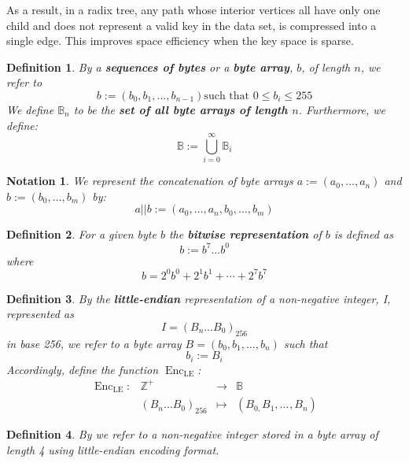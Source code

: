 \documentclass{book}
\newcommand{\assign}{:=}
\newcommand{\tmname}[1]{\textsc{#1}}
\newcommand{\tmop}[1]{\ensuremath{\operatorname{#1}}}
\newcommand{\tmstrong}[1]{\textbf{#1}}
\newcommand{\tmtextbf}[1]{{\bfseries{#1}}}
\newcommand{\tmtextsc}[1]{{\scshape{#1}}}
\newcommand{\tmtexttt}[1]{{\ttfamily{#1}}}
\newcommand{\tmverbatim}[1]{{\ttfamily{#1}}}
\newtheorem{definition}{Definition}
\newtheorem{notation}{Notation}
\providecommand{\tmname}[1]{\tmtextsc{#1}}
\providecommand{\tmop}[1]{\ensuremath{\mathrm{#1}}}
\providecommand{\tmstrong}[1]{\tmtextbf{#1}}
\providecommand{\tmtextbf}[1]{\tmtextbf{#1}}
\providecommand{\tmverbatim}[1]{\tmtexttt{#1}}
\newtheorem{definition}{Definition}
\newtheorem{notation}{Notation}
\begin{document}
As a result, in a radix tree, any path whose interior vertices all have only
one child and does not represent a valid key in the data set, is compressed
into a single edge. This improves space efficiency when the key space is
sparse.

\begin{definition}
  By a {\tmstrong{sequences of bytes}} or a {\tmstrong{byte array}}, $b$, of
  length $n$, we refer to
  \[ b \assign (b_0, b_1, ..., b_{n - 1})  \text{such that } 0 \leqslant b_i
     \leqslant 255 \]
  We define \label{autolab2}$\mathbb{B}_n$ to be the {\tmstrong{set of all
  byte arrays of length $n$}}. Furthermore, we define:
  \[ \mathbb{B} \assign \bigcup^{\infty}_{i = 0} \mathbb{B}_i \]
\end{definition}

\begin{notation}
  We represent the concatenation of byte arrays $a \assign (a_0, \ldots, a_n)$
  and $b \assign (b_0, \ldots, b_m)$ by:
  \[ a || b \assign (a_0, \ldots, a_n, b_0, \ldots, b_m) \]
\end{notation}

\begin{definition}
  \label{defn-bit-rep}For a given byte $b$ the {\tmstrong{bitwise
  representation}} of $b$ is defined as
  \[ b \assign b^7 \ldots b^0 \]
  where
  \[ b = 2^0 b^0 + 2^1 b^1 + \cdots + 2^7 b^7 \]
\end{definition}

\begin{definition}
  \label{defn-little-endian}By \tmverbatim{}the {\tmstrong{little-endian}}
  representation of a non-negative integer, \label{autolab3}I, represented as
  \[ I = (B_n \ldots B_0)_{256} \]
  in base 256, we refer to a byte array \label{autolab4}$B = (b_0, b_1,
  \ldots, b_n)$ such that
  \[ b_i \assign B_i \]
  Accordingly, define the function \label{autolab5}$\tmop{Enc}_{\tmop{LE}}$:
  \[ \begin{array}{llll}
       \tmop{Enc}_{\tmop{LE}} : & \mathbb{Z}^+ & \rightarrow & \mathbb{B}\\
       & (B_n \ldots B_0)_{256} & \mapsto & (B_{0,} B_1, \ldots_{}, B_n)
     \end{array} \]
  
\end{definition}

\begin{definition}
  By {\tmname{{\tmstrong{\tmverbatim{UINT32}}}}} we refer to a non-negative
  integer stored in a byte array of length 4 using little-endian encoding
  format.
\end{definition}
\end{document}
